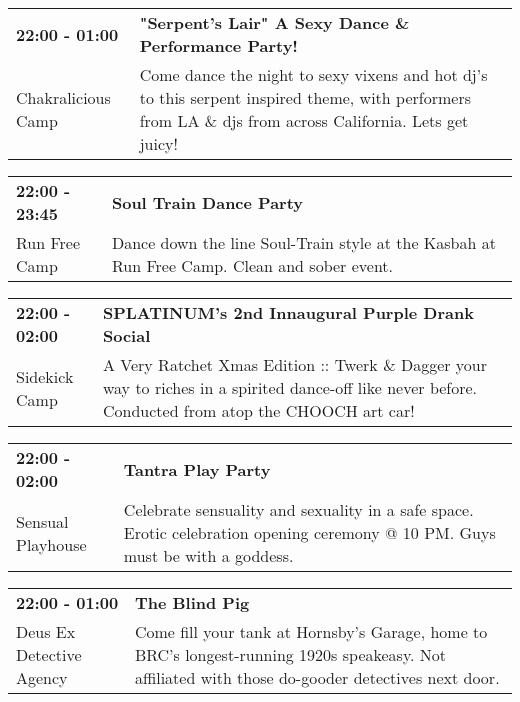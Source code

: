 \begin{tabular}{ p{1in} p{2.2in} }
    \textbf{22:00 - 01:00} & \textbf{"Serpent's Lair" A Sexy Dance \& Performance Party!} \\
    Chakralicious Camp \newline  & Come dance the night to sexy vixens and hot dj's to this serpent inspired theme, with performers from LA \& djs from across California. Lets get juicy! \\
    \hline 
\end{tabular}
    
\begin{tabular}{ p{1in} p{2.2in} }
    \textbf{22:00 - 23:45} & \textbf{Soul Train Dance Party} \\
    Run Free Camp \newline  & Dance down the line Soul-Train style at the Kasbah at Run Free Camp. Clean and sober event. \\
    \hline 
\end{tabular}
    
\begin{tabular}{ p{1in} p{2.2in} }
    \textbf{22:00 - 02:00} & \textbf{SPLATINUM's 2nd Innaugural Purple Drank Social} \\
    Sidekick Camp \newline  & A Very Ratchet Xmas Edition :: Twerk \& Dagger your way to riches in a spirited dance-off like never before.  Conducted from atop the CHOOCH art car! \\
    \hline 
\end{tabular}
    
\begin{tabular}{ p{1in} p{2.2in} }
    \textbf{22:00 - 02:00} & \textbf{Tantra Play Party} \\
    Sensual Playhouse \newline  & Celebrate sensuality and sexuality in a safe space. Erotic celebration opening ceremony @ 10 PM. Guys must be with a goddess. \\
    \hline 
\end{tabular}
    
\begin{tabular}{ p{1in} p{2.2in} }
    \textbf{22:00 - 01:00} & \textbf{The Blind Pig} \\
    Deus Ex Detective Agency \newline  & Come fill your tank at Hornsby's Garage, home to BRC's longest-running 1920s speakeasy. Not affiliated with those do-gooder detectives next door. \\
    \hline 
\end{tabular}
    
